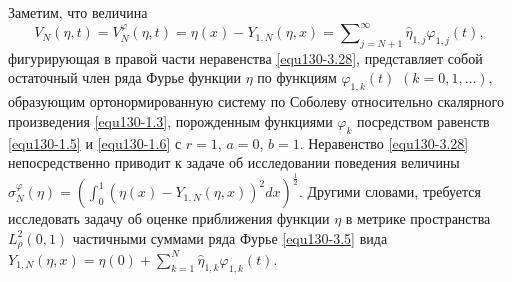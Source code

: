 Заметим,  что величина
\begin{equation}\label{equ130-3.30}
 V_N(\eta,t)=V_N^\varphi(\eta,t)=\eta(x)- Y_{1,N}(\eta,x)
=\sum\nolimits_{j=N+1}^\infty \hat \eta_{1,j}\varphi_{1,j}(t),
\end{equation}
  фигурирующая в правой части неравенства \eqref{equ130-3.28}, представляет собой остаточный член ряда Фурье функции $\eta$ по функциям $\varphi_{1,k}(t)$ $(k=0,1,\ldots)$, образующим ортонормированную систему по Соболеву относительно скалярного произведения \eqref{equ130-1.3}, порожденным  функциями $\varphi_k$ посредством равенств \eqref{equ130-1.5} и \eqref{equ130-1.6} с $r=1$, $a=0$, $b=1$.  Неравенство \eqref{equ130-3.28} непосредственно приводит к  задаче об исследовании поведения величины $\sigma_N^\varphi(\eta)=(\int_{0}^1(\eta(x)- Y_{1,N}(\eta,x))^2 dx)^\frac12$.
Другими словами, требуется исследовать задачу об оценке приближения функции $\eta$ в метрике пространства $L^2_{\rho}(0,1)$ частичными суммами   ряда Фурье \eqref{equ130-3.5} вида $Y_{1,N}(\eta,x)= \eta(0)+ \sum\nolimits_{k=1}^N \hat \eta_{1,k}\varphi_{1,k}(t).$







